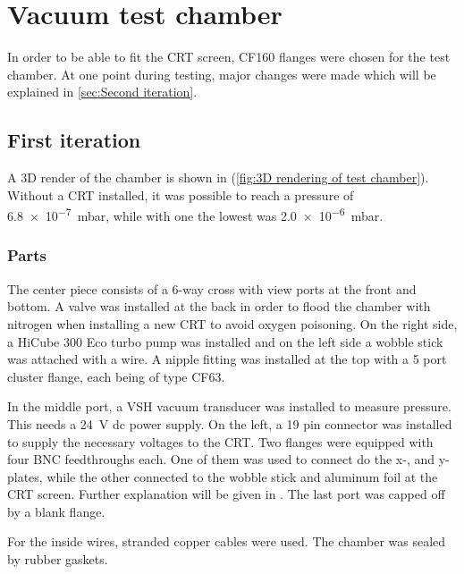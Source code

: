 
\chapter{Vacuum test chamber}
\label{ch:Vacuum chamber}

In order to be able to fit the CRT screen, CF160 flanges were chosen for the test chamber. At one point during testing, major changes were made which will be explained in \cref{sec:Second iteration}.

\section{First iteration}
\label{sec:vacuum chamber first iteration}

A 3D render of the chamber is shown in  (\cref{fig:3D rendering of test chamber}). Without a CRT installed, it was possible to reach a pressure of \SI{6.8e-7}{\milli\bar}, while with one the lowest was \SI{2.0e-6}{\milli\bar}.
 
\subsection{Parts}
\label{subsec:Parts}
 
The center piece consists of a 6-way cross with view ports at the front and bottom. A valve was installed at the back in order to flood the chamber with nitrogen when installing a new CRT to avoid oxygen poisoning. On the right side, a HiCube 300 Eco turbo pump was installed and on the left side a wobble stick was attached with a wire. A nipple fitting  was installed at the top with a 5 port cluster flange, each being of type CF63.
 
In the middle port, a VSH vacuum transducer was installed to measure pressure. This needs a \SI{24}{\volt} dc power supply. On the left, a 19 pin connector  was installed to supply the necessary voltages to the CRT. Two flanges were equipped with four BNC feedthroughs each. One of them was used to connect do the x-, and y-plates, while the other connected to the wobble stick and aluminum foil at the CRT screen. Further explanation will be given in . The last port was capped off by a blank flange.
 
For the inside wires, stranded copper cables were used. The chamber was sealed by rubber gaskets.
 

